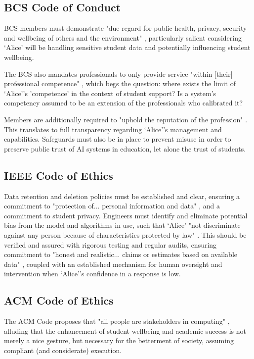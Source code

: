\documentclass[14pt,a4paper]{article}
\begin{document}
\begin{multicols}{2}
\subsection{BCS Code of Conduct}
BCS members must demonstrate "due regard for public health, privacy, security and wellbeing of others and the environment" \textit{\parencite[p. 2]{BCS2024}}, particularly salient considering `Alice' will be handling sensitive student data and potentially influencing student wellbeing.

The BCS also mandates professionals to only provide service "within [their] professional competence" \textit{\parencite[p. 2]{BCS2024}}, which begs the question: where exists the limit of `Alice''s 'competence' in the context of student support?
Is a system's competency assumed to be an extension of the professionals who calibrated it?

Members are additionally required to "uphold the reputation of the profession" \textit{\parencite[p. 3]{BCS2024}}.
This translates to full transparency regarding `Alice''s management and capabilities.
Safeguards must also be in place to prevent misuse in order to preserve public trust of AI systems in education, let alone the trust of students.

\subsection{IEEE Code of Ethics}
Data retention and deletion policies must be established and clear, ensuring a commitment to "protection of... personal information and data" \textit{\parencite[p. 1]{IEEE2024}}, and a commitment to student privacy.
Engineers must identify and eliminate potential bias from the model and algorithms in use, such that `Alice' "not discriminate against any person because of characteristics protected by law" \textit{\parencite[p. 1]{IEEE2024}}.
This should be verified and assured with rigorous testing and regular audits, ensuring commitment to "honest and realistic... claims or estimates based on available data" \textit{\parencite[p. 2]{IEEE2024}}, coupled with an established mechanism for human oversight and intervention when `Alice''s confidence in a response is low.

\subsection{ACM Code of Ethics}
The ACM Code proposes that "all people are stakeholders in computing" \textit{\parencite[p. 1]{ACM2024}}, alluding that the enhancement of student wellbeing and academic success is not merely a nice gesture, but necessary for the betterment of society, assuming compliant (and considerate) execution.


\end{multicols}
\end{document}
